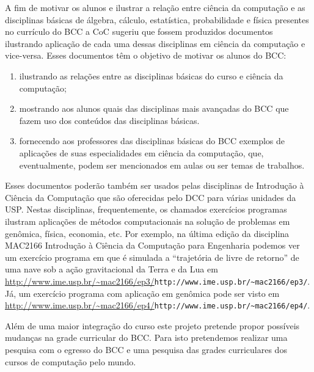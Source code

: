 

A fim de motivar os alunos e ilustrar a relação entre ciência da computação e
as disciplinas básicas de álgebra, cálculo, estatística, probabilidade e
física presentes no currículo do BCC a CoC sugeriu que fossem produzidos
documentos ilustrando aplicação de cada uma dessas disciplinas em ciência
da computação e vice-versa.  Esses documentos têm o
objetivo de motivar os alunos do BCC:
\begin{enumerate}%
\item ilustrando as relações entre as disciplinas
      básicas do curso e ciência da computação;
\item mostrando aos alunos quais das disciplinas mais avançadas do BCC
      que fazem uso dos conteúdos das disciplinas básicas.
\item \label{proc-esto} fornecendo aos professores das disciplinas básicas
      do BCC exemplos de aplicações de suas especialidades em ciência
      da computação, que, eventualmente, podem ser mencionados em aulas
      ou ser temas de trabalhos.
\end{enumerate}

Esses documentos poderão também ser usados pelas disciplinas de
Introdução à Ciência da Computação que são oferecidas pelo DCC para
várias unidades da USP. Nestas disciplinas, frequentemente, os chamados
exercícios programas ilustram aplicações de métodos computacionais na
solução de problemas em genômica, física, economia, etc.
Por exemplo, na última edição da disciplina
MAC2166 Introdução à Ciência da Computação para Engenharia
podemos ver um exercício programa em que é simulada
a ``trajetória de livre de retorno'' de uma nave sob a ação gravitacional da
Terra e da Lua em
{\scriptsize
\url{http://www.ime.usp.br/~mac2166/ep3/}{\texttt{http://www.ime.usp.br/\~ \null mac2166/ep3/}}}. Já, um exercício programa com aplicação em genômica pode ser visto em \url{http://www.ime.usp.br/~mac2166/ep4/}{\texttt{http://www.ime.usp.br/\~ \null mac2166/ep4/}}.


Além de uma maior integração do curso este projeto pretende propor possíveis
mudanças na grade curricular do BCC. %
Para isto pretendemos realizar uma pesquisa com o egresso do
BCC e uma pesquisa das grades curriculares dos cursos de computação
pelo mundo.
